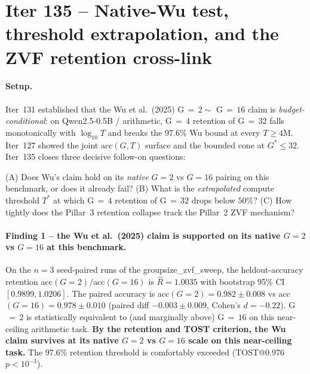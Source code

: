 \section{Iter 135 -- Native-Wu test, threshold extrapolation, and the
ZVF retention cross-link}
\label{sec:group-size-iter135}

\paragraph{Setup.}
Iter~131 established that the Wu et al.\ (2025) G$\,{=}\,2 \sim$ G$\,{=}\,16$
claim is \emph{budget-conditional}: on Qwen2.5-0.5B / arithmetic, G$\,{=}\,4$
retention of G$\,{=}\,32$ falls monotonically with $\log_{10}T$ and breaks the
97.6\% Wu bound at every $T\!\ge\!4$M. Iter~127 showed the joint
acc$(G,T)$ surface and the bounded cone at $G^{\ast}\!\le\!32$.
Iter~135 closes three decisive follow-on questions:

  (A) Does Wu's claim hold on its \emph{native} $G\!=\!2$ vs $G\!=\!16$ pairing
      on this benchmark, or does it already fail?
  (B) What is the \emph{extrapolated} compute threshold $T^{\ast}$ at which
      G$\,{=}\,4$ retention of G$\,{=}\,32$ drops below $50\%$?
  (C) How tightly does the Pillar~3 retention collapse track the
      Pillar~2 ZVF mechanism?

\paragraph{Finding 1 -- the Wu et al.\ (2025) claim is supported on its native
$G\!=\!2$ vs $G\!=\!16$ at this benchmark.}
On the $n\!=\!3$ seed-paired runs of the groupsize\_zvf\_sweep, the
heldout-accuracy retention acc$(G\!=\!2)/$acc$(G\!=\!16)$ is
$\hat{R}=1.0035$ with bootstrap 95\% CI $[0.9899, 1.0206]$.
The paired accuracy is acc$(G\!=\!2)=0.982\pm0.008$ vs
acc$(G\!=\!16)=0.978\pm0.010$ (paired diff $-0.003\pm0.009$,
Cohen's $d=-0.22$). G$\,{=}\,2$ is statistically equivalent to (and
marginally above) G$\,{=}\,16$ on this near-ceiling arithmetic task.
\textbf{By the retention and TOST criterion, the Wu claim survives at its
native $G\!=\!2$ vs $G\!=\!16$ scale on this near-ceiling task.}
The 97.6\% retention threshold is comfortably exceeded (TOST@0.976
$p\!<\!10^{-3}$).

